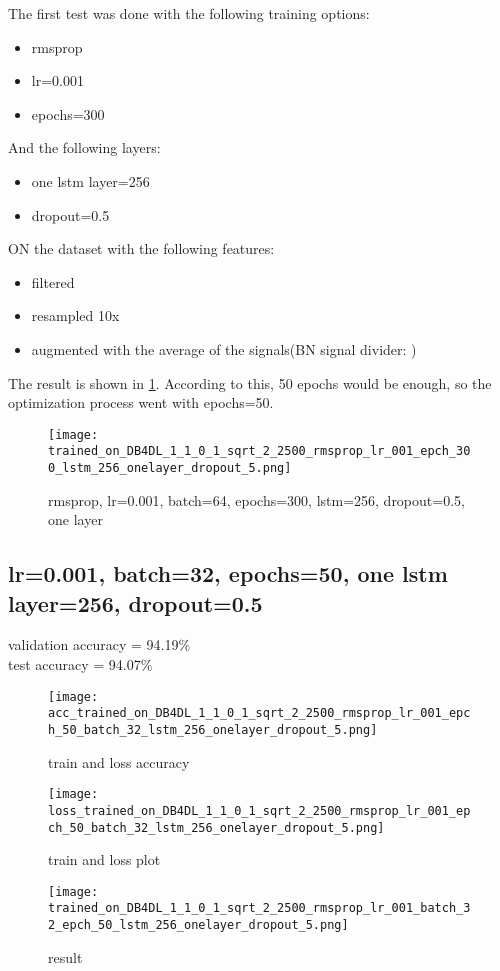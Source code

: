 \documentclass{article}
\begin{document}
The first test was done with the following training options:
\begin{itemize}
    \item rmsprop
    \item lr=0.001 
    \item epochs=300
\end{itemize}
And the following layers:
\begin{itemize}
    \item one lstm layer=256
    \item dropout=0.5
\end{itemize}
ON the dataset with the following features:
\begin{itemize}
    \item filtered
    \item resampled 10x
    \item augmented with the average of the signals(BN signal divider: )
\end{itemize}
\newpage
The result is shown in \figurename{\ref{trained_on_DB4DL_1_1_0_1_sqrt_2_2500_rmsprop_lr_001_epch_300_lstm_256_onelayer_dropout_5}}. According to this, 50 epochs would be enough, so the optimization process went with epochs=50. 

\begin{figure}[H]
\centering
\texttt{[image: trained\_on\_DB4DL\_1\_1\_0\_1\_sqrt\_2\_2500\_rmsprop\_lr\_001\_epch\_300\_lstm\_256\_onelayer\_dropout\_5.png]}
\caption{rmsprop, lr=0.001, batch=64, epochs=300, lstm=256, dropout=0.5, one layer}
\label{trained_on_DB4DL_1_1_0_1_sqrt_2_2500_rmsprop_lr_001_epch_300_lstm_256_onelayer_dropout_5}
\end{figure}

\bigskip
\subsection{lr=0.001, batch=32, epochs=50, one lstm layer=256, dropout=0.5}
validation accuracy = 94.19\%
\\
test accuracy = 94.07\%

\begin{figure}[H]
\centering
\texttt{[image: acc\_trained\_on\_DB4DL\_1\_1\_0\_1\_sqrt\_2\_2500\_rmsprop\_lr\_001\_epch\_50\_batch\_32\_lstm\_256\_onelayer\_dropout\_5.png]}
\caption{train and loss accuracy}
\end{figure}

\begin{figure}[H]
\centering
\texttt{[image: loss\_trained\_on\_DB4DL\_1\_1\_0\_1\_sqrt\_2\_2500\_rmsprop\_lr\_001\_epch\_50\_batch\_32\_lstm\_256\_onelayer\_dropout\_5.png]}
\caption{train and loss plot}
\end{figure}

\begin{figure}[H]
\centering
\texttt{[image: trained\_on\_DB4DL\_1\_1\_0\_1\_sqrt\_2\_2500\_rmsprop\_lr\_001\_batch\_32\_epch\_50\_lstm\_256\_onelayer\_dropout\_5.png]}
\caption{result}
\end{figure}
\end{document}
